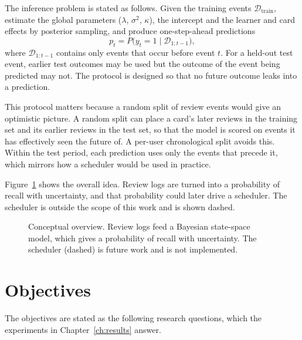 The inference problem is stated as follows. Given the training events $\mathcal{D}_{\mathrm{train}}$,
estimate the global parameters ($\lambda$, $\sigma^2$, $\kappa$), the intercept and the learner and
card effects by posterior sampling, and produce one-step-ahead predictions
\begin{equation}
  p_t = P\bigl(y_t = 1 \mid \mathcal{D}_{1:t-1}\bigr),
  \label{eq:predict}
\end{equation}
where $\mathcal{D}_{1:t-1}$ contains only events that occur before event $t$. For a held-out test
event, earlier test outcomes may be used but the outcome of the event being predicted may not. The
protocol is designed so that no future outcome leaks into a prediction.

This protocol matters because a random split of review events would give an optimistic picture. A
random split can place a card's later reviews in the training set and its earlier reviews in the
test set, so that the model is scored on events it has effectively seen the future of. A per-user
chronological split avoids this. Within the test period, each prediction uses only the events that
precede it, which mirrors how a scheduler would be used in practice.

Figure~\ref{fig:tk_concept_overview} shows the overall idea. Review logs are turned into a
probability of recall with uncertainty, and that probability could later drive a scheduler. The
scheduler is outside the scope of this work and is shown dashed.

\begin{figure}[htbp]
  \centering
  
  \caption{Conceptual overview. Review logs feed a Bayesian state-space model, which gives a
    probability of recall with uncertainty. The scheduler (dashed) is future work and is not
    implemented.}
  \label{fig:tk_concept_overview}
\end{figure}

\section{Objectives}
\label{sec:intro-objectives}

The objectives are stated as the following research questions, which the experiments in
Chapter~\ref{ch:results} answer.

